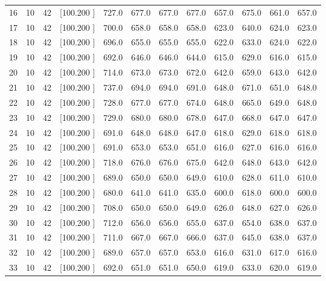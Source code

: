 \documentclass[12pt,a4paper]{article}
\begin{document}
\begin{center}
{\begin{tabular}{r r r r r r r r r r r r}
  16& 10& 42&[100.200   ]&   727.0&   677.0&   677.0&   677.0&   657.0&   675.0&   661.0&   657.0\\[-0.02in]
  17& 10& 42&[100.200   ]&   700.0&   658.0&   658.0&   658.0&   623.0&   640.0&   624.0&   623.0\\[-0.02in]
  18& 10& 42&[100.200   ]&   696.0&   655.0&   655.0&   655.0&   622.0&   633.0&   624.0&   622.0\\[-0.02in]
  19& 10& 42&[100.200   ]&   692.0&   646.0&   646.0&   644.0&   615.0&   629.0&   616.0&   615.0\\[-0.02in]
  20& 10& 42&[100.200   ]&   714.0&   673.0&   673.0&   672.0&   642.0&   659.0&   643.0&   642.0\\[-0.02in]
  21& 10& 42&[100.200   ]&   737.0&   694.0&   694.0&   691.0&   648.0&   671.0&   651.0&   648.0\\[-0.02in]
  22& 10& 42&[100.200   ]&   728.0&   677.0&   677.0&   674.0&   648.0&   665.0&   649.0&   648.0\\[-0.02in]
  23& 10& 42&[100.200   ]&   729.0&   680.0&   680.0&   678.0&   647.0&   668.0&   647.0&   647.0\\[-0.02in]
  24& 10& 42&[100.200   ]&   691.0&   648.0&   648.0&   647.0&   618.0&   629.0&   618.0&   618.0\\[-0.02in]
  25& 10& 42&[100.200   ]&   691.0&   653.0&   653.0&   651.0&   616.0&   627.0&   616.0&   616.0\\[-0.02in]
  26& 10& 42&[100.200   ]&   718.0&   676.0&   676.0&   675.0&   642.0&   648.0&   643.0&   642.0\\[-0.02in]
  27& 10& 42&[100.200   ]&   689.0&   650.0&   650.0&   649.0&   610.0&   628.0&   611.0&   610.0\\[-0.02in]
  28& 10& 42&[100.200   ]&   680.0&   641.0&   641.0&   635.0&   600.0&   618.0&   600.0&   600.0\\[-0.02in]
  29& 10& 42&[100.200   ]&   708.0&   650.0&   650.0&   649.0&   626.0&   648.0&   627.0&   626.0\\[-0.02in]
  30& 10& 42&[100.200   ]&   712.0&   656.0&   656.0&   655.0&   637.0&   654.0&   638.0&   637.0\\[-0.02in]
  31& 10& 42&[100.200   ]&   711.0&   667.0&   667.0&   666.0&   637.0&   645.0&   638.0&   637.0\\[-0.02in]
  32& 10& 42&[100.200   ]&   689.0&   657.0&   657.0&   653.0&   616.0&   631.0&   617.0&   616.0\\[-0.02in]
  33& 10& 42&[100.200   ]&   692.0&   651.0&   651.0&   650.0&   619.0&   633.0&   620.0&   619.0\\[-0.02in]

\end{tabular}}
\end{center}
\end{document}
